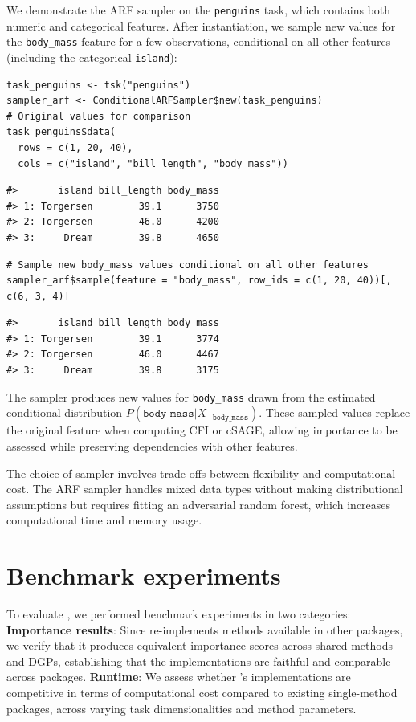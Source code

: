 We demonstrate the ARF sampler on the \texttt{penguins} task, which contains both numeric and categorical features.
After instantiation, we sample new values for the \texttt{body\_mass} feature for a few observations, conditional on all other features (including the categorical \texttt{island}):

\begin{verbatim}
task_penguins <- tsk("penguins")
sampler_arf <- ConditionalARFSampler$new(task_penguins)
# Original values for comparison
task_penguins$data(
  rows = c(1, 20, 40),
  cols = c("island", "bill_length", "body_mass"))
\end{verbatim}

\begin{verbatim}
#>       island bill_length body_mass
#> 1: Torgersen        39.1      3750
#> 2: Torgersen        46.0      4200
#> 3:     Dream        39.8      4650
\end{verbatim}

\begin{verbatim}
# Sample new body_mass values conditional on all other features
sampler_arf$sample(feature = "body_mass", row_ids = c(1, 20, 40))[, c(6, 3, 4)]
\end{verbatim}

\begin{verbatim}
#>       island bill_length body_mass
#> 1: Torgersen        39.1      3774
#> 2: Torgersen        46.0      4467
#> 3:     Dream        39.8      3175
\end{verbatim}

The sampler produces new values for \texttt{body\_mass} drawn from the estimated conditional distribution \(P(\mathtt{body\_mass} | X_{-\mathtt{body\_mass}})\).
These sampled values replace the original feature when computing CFI or cSAGE, allowing importance to be assessed while preserving dependencies with other features.

The choice of sampler involves trade-offs between flexibility and computational cost.
The ARF sampler handles mixed data types without making distributional assumptions but requires fitting an adversarial random forest, which increases computational time and memory usage.

\section{Benchmark experiments}\label{sec-benchmark}

To evaluate , we performed benchmark experiments in two categories:
\textbf{Importance results}: Since  re-implements methods available in other packages, we verify that it produces equivalent importance scores across shared methods and DGPs, establishing that the implementations are faithful and comparable across packages.
\textbf{Runtime}: We assess whether 's implementations are competitive in terms of computational cost compared to existing single-method packages, across varying task dimensionalities and method parameters.


